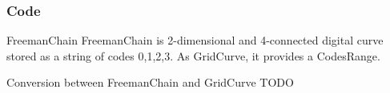 \begin{frame}
  \frametitle{Code}

  \begin{block}{FreemanChain}
FreemanChain is 2-dimensional and 4-connected digital curve stored as a string of codes {0,1,2,3}. 
As GridCurve, it provides a CodesRange.
  \end{block}

  \begin{block}{Conversion between FreemanChain and GridCurve}
TODO
  \end{block}

\end{frame}


